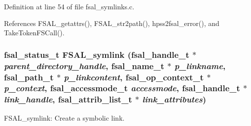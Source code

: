 Definition at line 54 of file fsal\_\-symlinks.c.

References FSAL\_\-getattrs(), FSAL\_\-str2path(), hpss2fsal\_\-error(), and Take\-Token\-FSCall().
\subsubsection{\setlength{\rightskip}{0pt plus 5cm}fsal\_\-status\_\-t FSAL\_\-symlink (fsal\_\-handle\_\-t $\ast$ {\em parent\_\-directory\_\-handle}, fsal\_\-name\_\-t $\ast$ {\em p\_\-linkname}, fsal\_\-path\_\-t $\ast$ {\em p\_\-linkcontent}, fsal\_\-op\_\-context\_\-t $\ast$ {\em p\_\-context}, fsal\_\-accessmode\_\-t {\em accessmode}, fsal\_\-handle\_\-t $\ast$ {\em link\_\-handle}, fsal\_\-attrib\_\-list\_\-t $\ast$ {\em link\_\-attributes})}\label{fsal__symlinks_8c_a1}


FSAL\_\-symlink: Create a symbolic link.


